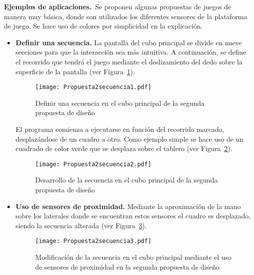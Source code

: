 \textbf{Ejemplos de aplicaciones.}\
Se proponen algunas propuestas de juegos de manera muy básica, donde son utilizados los diferentes sensores de la plataforma de juego. Se hace uso de colores por simplicidad en la explicación.

\begin{itemize}
\item \textbf{Definir una secuencia.} La pantalla del cubo principal se divide en nueve secciones para que la interacción sea más intuitiva.
A continuación, se define el recorrido que tendrá el juego mediante el deslizamiento del dedo sobre la superficie de la pantalla (ver Figura~\ref{fig:Propuesta2secuencia1}).
\begin{figure}[!h]
\begin{center}
\texttt{[image: Propuesta2secuencia1.pdf]}
\caption{Definir una secuencia en el cubo principal de la segunda propuesta de diseño}
\label{fig:Propuesta2secuencia1}
\end{center}
\end{figure}
El programa comienza a ejecutarse en función del recorrido marcado, desplazándose de un cuadro a otro. Como ejemplo simple se hace uso de un cuadrado de color verde que se desplaza sobre el tablero (ver Figura~\ref{fig:Propuesta2secuencia2}).\

\begin{figure}[!h]
\begin{center}
\texttt{[image: Propuesta2secuencia2.pdf]}
\caption{Desarrollo de la secuencia en el cubo principal de la segunda propuesta de diseño}
\label{fig:Propuesta2secuencia2}
\end{center}
\end{figure}

\item \textbf{Uso de sensores de proximidad.} Mediante la aproximación de la mano sobre los laterales donde se encuentran estos sensores el cuadro es desplazado, siendo la secuencia alterada (ver Figura~\ref{fig:Propuesta2secuencia3}).\

\begin{figure}[!h]
\begin{center}
\texttt{[image: Propuesta2secuencia3.pdf]}
\caption{Modificación de la secuencia en el cubo principal mediante el uso de sensores de proximidad en la segunda propuesta de diseño}
\label{fig:Propuesta2secuencia3}
\end{center}
\end{figure}



\end{itemize}
